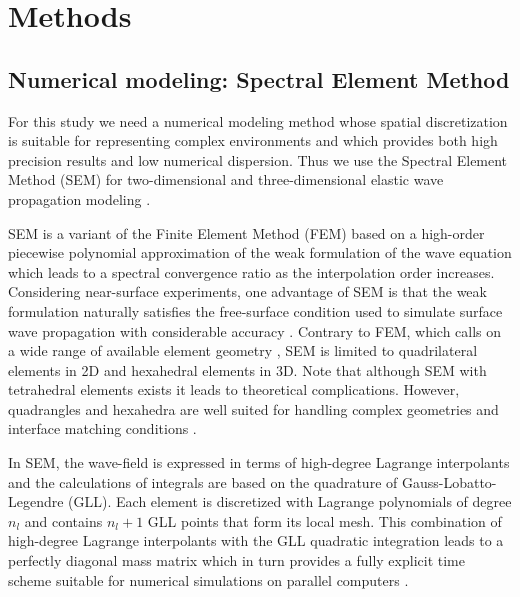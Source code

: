 \documentclass[manuscript,revised]{geophysics}
\begin{document}
\section{Methods}

\subsection{Numerical modeling: Spectral Element Method}

\noindent For this study we need a numerical modeling method whose spatial discretization is suitable for representing complex environments and which provides both high precision results and low numerical dispersion. Thus we use the Spectral Element Method (SEM) for two-dimensional and three-dimensional elastic wave propagation modeling \citep{Komatitsch_SEM_1998,Komatitsch_ISM_1999,Komatitsch_SEM_2005,Festa_PML_2005}. 

\noindent SEM is a variant of the Finite Element Method (FEM) \citep{Lysmer_FEM_1972,Seron_FEM_1990,Hulbert_FEM_1990,Tromp_SEM_2008} based on a high-order piecewise polynomial approximation of the weak formulation of the wave equation which leads to a spectral convergence ratio as the interpolation order increases. Considering near-surface experiments, one advantage of SEM is that the weak formulation naturally satisfies the free-surface condition used to simulate surface wave propagation with considerable accuracy \citep{komatitsch1998spectral,komatitsch1999spectral,Komatitsch_SEM_2005}. Contrary to FEM, which calls on a wide range of available element geometry \citep{dhatt1984finite}, SEM is limited to quadrilateral elements in 2D and hexahedral elements in 3D. Note that although SEM with tetrahedral elements exists \citep{komatitsch2001wave} it leads to theoretical complications. However, quadrangles and hexahedra are well suited for handling complex geometries and interface matching conditions \citep{Cristini_SEM_2012}. 

\noindent In SEM, the wave-field is expressed in terms of high-degree Lagrange interpolants and the calculations of integrals are based on the quadrature of Gauss-Lobatto-Legendre (GLL). Each element is discretized with Lagrange polynomials of degree $n_{l}$ and contains $n_{l}+1$ GLL points that form its local mesh. This combination of high-degree Lagrange interpolants with the GLL quadratic integration leads to a perfectly diagonal mass matrix which in turn provides a fully explicit time scheme suitable for numerical simulations on parallel computers \citep{komatitsch1998spectral,komatitsch1999spectral}.
\end{document}
